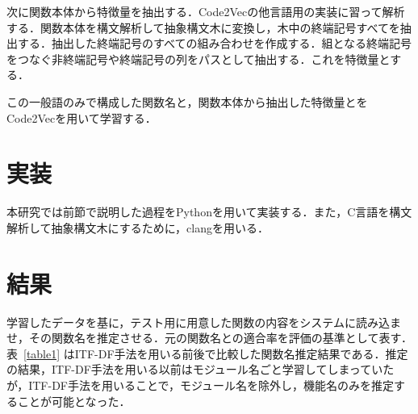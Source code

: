 \documentclass[submit,techrep,noauthor]{ipsj}
\begin{document}
次に関数本体から特徴量を抽出する．Code2Vecの他言語用の実装に習って解析する．関数本体を構文解析して抽象構文木に変換し，木中の終端記号すべてを抽出する．抽出した終端記号のすべての組み合わせを作成する．組となる終端記号をつなぐ非終端記号や終端記号の列をパスとして抽出する．これを特徴量とする．

この一般語のみで構成した関数名と，関数本体から抽出した特徴量とをCode2Vecを用いて学習する．







\section{実装}

本研究では前節で説明した過程をPythonを用いて実装する．また，C言語を構文解析して抽象構文木にするために，clangを用いる．

\section{結果}
学習したデータを基に，テスト用に用意した関数の内容をシステムに読み込ませ，その関数名を推定させる．元の関数名との適合率を評価の基準として表す．
表~\ref{table1} はITF-DF手法を用いる前後で比較した関数名推定結果である．推定の結果，ITF-DF手法を用いる以前はモジュール名ごと学習してしまっていたが，ITF-DF手法を用いることで，モジュール名を除外し，機能名のみを推定することが可能となった．
\end{document}
